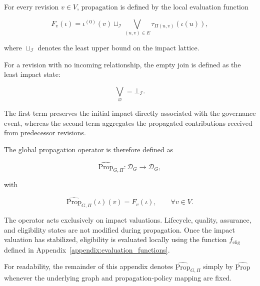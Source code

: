 \documentclass[10pt]{article}
\begin{document}

For every revision $v\in V$, propagation is defined by the local evaluation function

\begin{equation}
	\label{eq:local_transfer}
	F_v(\iota)
	=
	\iota^{(0)}(v)
	\sqcup_{\mathcal I}
	\bigvee_{(u,v)\in E}
	\tau_{\Pi(u,v)}
	\!\left(
	\iota(u)
	\right),
\end{equation}

where $\sqcup_{\mathcal I}$ denotes the least upper bound on the impact lattice.

For a revision with no incoming relationship, the empty join is defined as the least impact state:

\begin{equation}
	\bigvee_{\varnothing}
	=
	\bot_{\mathcal I}.
	\label{eq:empty_impact_join}
\end{equation}

The first term preserves the initial impact directly associated with the governance event, whereas the second term aggregates the propagated
contributions received from predecessor revisions.


The global propagation operator is therefore defined as

\begin{equation}
	\label{eq:impact_operator}
	\widehat{\mathrm{Prop}}_{G,\Pi}
	:
	\mathcal D_G
	\rightarrow
	\mathcal D_G,
\end{equation}

with

\begin{equation}
	\label{eq:impact_operator_definition}
	\widehat{\mathrm{Prop}}_{G,\Pi}(\iota)(v)
	=
	F_v(\iota),
	\qquad
	\forall v\in V.
\end{equation}

The operator acts exclusively on impact valuations.
Lifecycle, quality, assurance, and eligibility states are not modified during propagation. Once the impact valuation has stabilized, eligibility is evaluated locally using the function
$f_{\mathrm{elig}}$
defined in Appendix~\ref{appendix:evaluation_functions}.

For readability, the remainder of this appendix denotes
$\widehat{\mathrm{Prop}}_{G,\Pi}$ simply by
$\widehat{\mathrm{Prop}}$
whenever the underlying graph and propagation-policy mapping are fixed.
\end{document}

